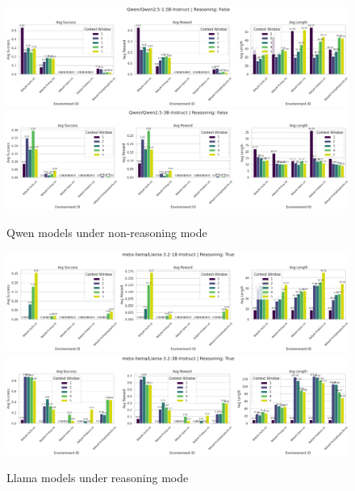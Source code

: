 \documentclass[11pt,a4paper]{article}
\begin{document}
\begin{figure}[H]
    \centering
    \includegraphics[width=1\linewidth]
    {../images/baseline_qwen_1.5B_NR.png}
    \includegraphics[width=1\linewidth]
    {../images/baseline_qwen_3B_NR.png}
    \caption{Qwen models under non-reasoning mode}
\end{figure}

\begin{figure}[H]
    \centering
    \includegraphics[width=1\linewidth]
    {../images/baseline_llama_1B_R.png}
    \includegraphics[width=1\linewidth]
    {../images/baseline_llama_3B_R.png}
    \caption{Llama models under reasoning mode}
\end{figure}
\end{document}
